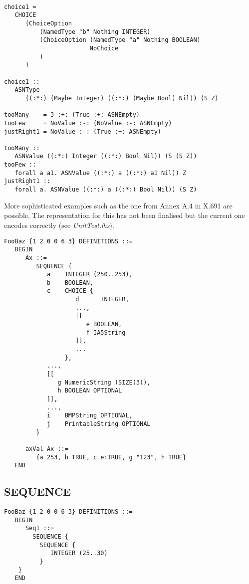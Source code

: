 \documentclass{article}
\begin{document}
\begin{lstlisting}[frame=single]

choice1 = 
   CHOICE 
      (ChoiceOption 
          (NamedType "b" Nothing INTEGER) 
          (ChoiceOption (NamedType "a" Nothing BOOLEAN) 
                        NoChoice
          )
      )

choice1 :: 
   ASNType 
      ((:*:) (Maybe Integer) ((:*:) (Maybe Bool) Nil)) (S Z)

tooMany    = 3 :+: (True :+: ASNEmpty)
tooFew     = NoValue :-: (NoValue :-: ASNEmpty)
justRight1 = NoValue :-: (True :+: ASNEmpty)

tooMany :: 
   ASNValue ((:*:) Integer ((:*:) Bool Nil)) (S (S Z))
tooFew :: 
   forall a a1. ASNValue ((:*:) a ((:*:) a1 Nil)) Z
justRight1 :: 
   forall a. ASNValue ((:*:) a ((:*:) Bool Nil)) (S Z)

\end{lstlisting}

More sophisticated examples such as the one from Annex A.4 in X.691 are
possible. The representation for this has not been finalised but the
current one encodes correctly (see {\em UnitTest.lhs}).

\begin{lstlisting}[frame=single]
FooBaz {1 2 0 0 6 3} DEFINITIONS ::=
   BEGIN
      Ax ::= 
         SEQUENCE {
            a    INTEGER (250..253),
            b    BOOLEAN,
            c    CHOICE {
                    d      INTEGER,
                    ...,
                    [[
                       e BOOLEAN,
                       f IA5String
                    ]],
                    ...
                 },
            ...,
            [[
               g NumericString (SIZE(3)),
               h BOOLEAN OPTIONAL
            ]],
            ...,
            i    BMPString OPTIONAL,
            j    PrintableString OPTIONAL
         }

      axVal Ax ::= 
         {a 253, b TRUE, c e:TRUE, g "123", h TRUE}
   END

\end{lstlisting}

\subsection{SEQUENCE}

\begin{lstlisting}[frame=single]
FooBaz {1 2 0 0 6 3} DEFINITIONS ::=
   BEGIN
      Seq1 ::= 
        SEQUENCE {
          SEQUENCE {
             INTEGER (25..30)
          }
	}
   END
\end{lstlisting}
\end{document}
